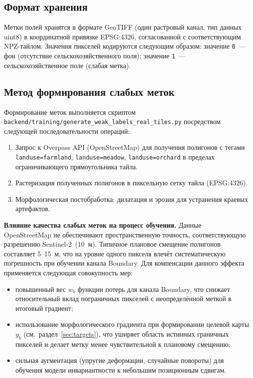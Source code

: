 \documentclass[14pt,a4paper]{extarticle}
\newcommand{\tbl}[1]{\texttt{#1}}  %
\begin{document}
\subsection{Формат хранения}

Метки полей хранятся в формате GeoTIFF (один растровый канал, тип данных
uint8) в координатной привязке EPSG:4326, согласованной с соответствующим
NPZ-тайлом. Значения пикселей кодируются следующим образом:
значение \tbl{0}~— фон (отсутствие сельскохозяйственного поля);
значение \tbl{1}~— сельскохозяйственное поле (слабая метка).

\subsection{Метод формирования слабых меток}

Формирование меток выполняется скриптом
\tbl{backend/training/generate\_weak\_labels\_real\_tiles.py}
посредством следующей последовательности операций:

\begin{enumerate}
  \item Запрос к Overpass API (OpenStreetMap) для получения полигонов
        с тегами \tbl{landuse=farmland}, \tbl{landuse=meadow},
        \tbl{landuse=orchard} в пределах ограничивающего прямоугольника тайла.
  \item Растеризация полученных полигонов в пиксельную сетку тайла (EPSG:4326).
  \item Морфологическая постобработка: дилатация и эрозия для устранения
        краевых артефактов.
\end{enumerate}

\textbf{Влияние качества слабых меток на процесс обучения.}
Данные OpenStreetMap не обеспечивают пространственную точность, соответствующую
разрешению Sentinel-2~(10~м). Типичное плановое смещение полигонов составляет
5--15~м, что на уровне одного пикселя влечёт систематическую погрешность
при обучении канала Boundary. Для компенсации данного эффекта применяется
следующая совокупность мер:
\begin{itemize}
  \item повышенный вес $w_b$ функции потерь для канала Boundary,
        что снижает относительный вклад пограничных пикселей с неопределённой
        меткой в итоговый градиент;
  \item использование морфологического градиента при формировании целевой
        карты $y_b$ (см.~раздел~\ref{sec:targets}), что уширяет область
        истинных граничных пикселей и делает метку менее чувствительной
        к плановому смещению;
  \item сильная аугментация (упругие деформации, случайные повороты)
        для обучения модели инвариантности к небольшим позиционным сдвигам.
\end{itemize}
\end{document}
